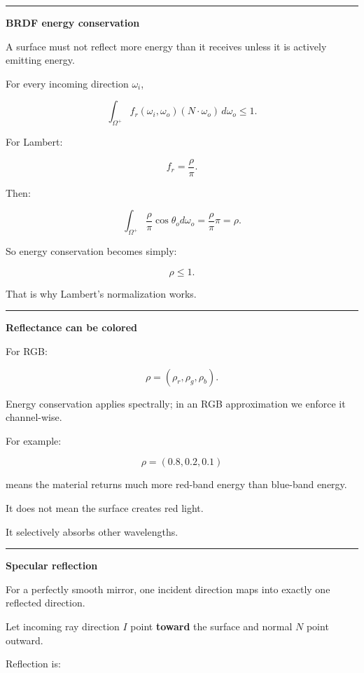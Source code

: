 \begin{center}\rule{0.5\linewidth}{0.5pt}\end{center}

\textbf{BRDF energy conservation}

A surface must not reflect more energy than it receives unless it is actively emitting energy.

For every incoming direction \(\omega_i\),

\[
\boxed{
\int_{\Omega^+}
f_r(\omega_i,\omega_o)
(N\cdot\omega_o)
\,d\omega_o
\le1.
}
\]

For Lambert:

\[
f_r=\frac{\rho}{\pi}.
\]

Then:

\[
\int_{\Omega^+}
\frac{\rho}{\pi}
\cos\theta_o
d\omega_o
=
\frac{\rho}{\pi}\pi
=
\rho.
\]

So energy conservation becomes simply:

\[
\rho\le1.
\]

That is why Lambert's normalization works.

\begin{center}\rule{0.5\linewidth}{0.5pt}\end{center}

\textbf{Reflectance can be colored}

For RGB:

\[
\rho=
(\rho_r,\rho_g,\rho_b).
\]

Energy conservation applies spectrally; in an RGB approximation we enforce it channel-wise.

For example:

\[
\rho=(0.8,0.2,0.1)
\]

means the material returns much more red-band energy than blue-band energy.

It does not mean the surface creates red light.

It selectively absorbs other wavelengths.

\begin{center}\rule{0.5\linewidth}{0.5pt}\end{center}

\textbf{Specular reflection}

For a perfectly smooth mirror, one incident direction maps into exactly one reflected direction.

Let incoming ray direction \(I\) point \textbf{toward} the surface and normal \(N\) point outward.

Reflection is:

